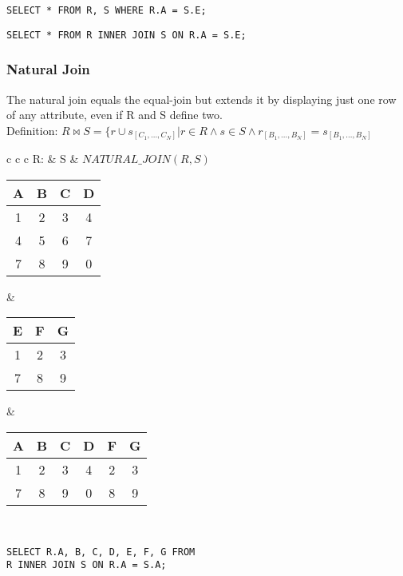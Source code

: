 \lstset{language=SQL,tabsize=4,captionpos=b,frame=single,
basicstyle=\footnotesize}
\begin{lstlisting}[caption=SQL Equi-Join]
SELECT * FROM R, S WHERE R.A = S.E;
\end{lstlisting}
\begin{lstlisting}[caption=SQL Equi-Join]
SELECT * FROM R INNER JOIN S ON R.A = S.E;
\end{lstlisting}

\subsubsection{Natural Join}
The natural join equals the equal-join but extends it by displaying just one row
of any attribute, even if R and S define two.\\
Definition: $R \bowtie S = \{r \cup s_{[C_1, \dots, C_N]} | r \in R \land s \in S
\land r_{[B_1, \dots, B_N]} = s_{[B_1, \dots, B_N]}$

\hspace{-0.5cm}
\begin{tabular}{ c c c}
	R: & S & $NATURAL\_JOIN(R,S)$ \\
	\begin{tabular}{|c|c|c|c|}
		\hline
		A & B & C & D\\
		\hline
		1 & 2 & 3 & 4\\
		\hline
		4 & 5 & 6 & 7\\
		\hline
		7 & 8 & 9 & 0\\
		\hline
	\end{tabular} &

	\begin{tabular}{|c|c|c|}
		\hline
		E & F & G \\
		\hline
		1 & 2 & 3\\
		\hline
		7 & 8 & 9\\
		\hline
	\end{tabular} &

	\begin{tabular}{|c|c|c|c|c|c|}
		\hline
		A & B & C & D & F & G \\
		\hline
		1 & 2 & 3 & 4 & 2 & 3\\
		\hline
		7 & 8 & 9 & 0 & 8 & 9\\
		\hline
	\end{tabular}
\end{tabular}\\

\lstset{language=SQL,tabsize=4,captionpos=b,frame=single,
basicstyle=\footnotesize}
\begin{lstlisting}[caption=SQL Natural-Join]
SELECT R.A, B, C, D, E, F, G FROM 
R INNER JOIN S ON R.A = S.A;
\end{lstlisting}

